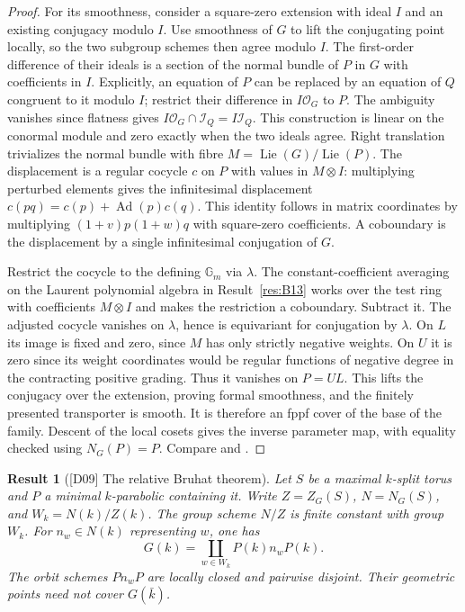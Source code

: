 \documentclass[11pt,a4paper,openany,oneside]{book}
\theoremstyle{resultstyle}
\newtheorem{statement}{Result}[chapter]
\newenvironment{result}[2]{\clubpenalty=10000\begin{statement}[\textnormal{[#1]} #2]\leavevmode\label{res:#1}\ignorespaces}{\end{statement}}
\theoremstyle{definition}
\numberwithin{equation}{chapter}
\newcommand{\Gm}{\mathbb{G}_m}
\DeclareMathOperator{\Lie}{Lie}
\begin{document}
\begin{proof}
For its smoothness, consider a square-zero extension with
ideal \(I\) and an existing conjugacy modulo \(I\).
Use smoothness of \(G\) to lift the conjugating point
locally, so the two subgroup schemes then agree modulo \(I\).
The first-order difference of their ideals is a section
of the normal bundle of \(P\) in \(G\) with coefficients
in \(I\). Explicitly, an equation of \(P\) can be
replaced by an equation of \(Q\) congruent to it modulo
\(I\); restrict their difference in \(I\mathcal O_G\)
to \(P\). The ambiguity vanishes since flatness gives
\(I\mathcal O_G\cap\mathcal I_Q=I\mathcal I_Q\).
This construction is linear on the conormal module
and zero exactly when the two ideals agree.
Right translation trivializes the normal bundle with
fibre \(M=\Lie(G)/\Lie(P)\). The displacement is a
regular cocycle \(c\) on \(P\) with values in \(M\otimes I\):
multiplying perturbed elements gives the infinitesimal
displacement \(c(pq)=c(p)+\operatorname{Ad}(p)c(q)\).
This identity follows in matrix coordinates by multiplying
\((1+v)p(1+w)q\) with square-zero coefficients.
A coboundary is the displacement by a single
infinitesimal conjugation of \(G\).

Restrict the cocycle to the defining \(\Gm\) via
\(\lambda\). The constant-coefficient averaging on
the Laurent polynomial algebra in Result~\ref{res:B13}
works over the test ring with coefficients \(M\otimes I\)
and makes the restriction a coboundary. Subtract it.
The adjusted cocycle vanishes on \(\lambda\), hence is
equivariant for conjugation by \(\lambda\).
On \(L\) its image is fixed and zero, since \(M\)
has only strictly negative weights. On \(U\) it is
zero since its weight coordinates would be regular
functions of negative degree in the contracting positive
grading. Thus it vanishes on \(P=UL\).
This lifts the conjugacy over the extension, proving
formal smoothness, and the finitely presented transporter
is smooth. It is therefore an fppf cover of the base
of the family. Descent of the local cosets gives the
inverse parameter map, with equality checked using
\(N_G(P)=P\). Compare \cite[Corollaries 5.2.8--5.2.9]{conrad}
and \cite[Section 25.a]{milne}.
\end{proof}

\begin{result}{D09}{The relative Bruhat theorem}
Let \(S\) be a maximal \(k\)-split torus and \(P\) a minimal \(k\)-parabolic containing it. Write \(Z=Z_G(S)\), \(N=N_G(S)\), and \(W_k=N(k)/Z(k)\). The group scheme \(N/Z\) is finite constant with group \(W_k\). For \(n_w\in N(k)\) representing \(w\), one has
\[
     G(k)=\coprod_{w\in W_k} P(k)n_wP(k).
\]
The orbit schemes \(Pn_wP\) are locally closed and pairwise disjoint. Their geometric points need not cover \(G(\bar k)\).
\end{result}
\end{document}
